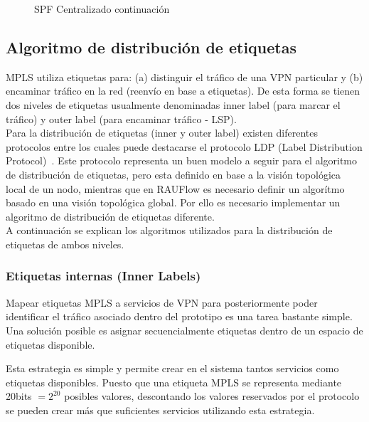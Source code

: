 \begin{figure}[ht!]
\begin{algorithm}[H]
{  
 \vspace{1cm} 
 }
 
\end{algorithm}
\caption[]{SPF Centralizado continuaci\'on}
\end{figure}

\newpage
\subsection{Algoritmo de distribución de etiquetas}
\label{section5.5.4}

MPLS utiliza etiquetas para: (a) distinguir el tr\'afico de una VPN particular y (b) encaminar tr\'afico en la red (reenvío en base a etiquetas). De esta forma se tienen dos niveles de etiquetas usualmente denominadas inner label (para marcar el tr\'afico) y outer label (para encaminar tr\'afico - LSP).\\

Para la distribución de etiquetas (inner y outer label) existen diferentes protocolos entre los cuales puede destacarse el protocolo LDP (Label Distribution Protocol)~\citep{LDPRFC}. Este protocolo representa un buen modelo a seguir para el algoritmo de distribución de etiquetas, pero esta definido en base a la visión topol\'ogica local de un nodo, mientras que en RAUFlow es necesario definir un algor\'itmo basado en una visi\'on topol\'ogica global. Por ello es necesario implementar un algoritmo de distribución de etiquetas diferente.\\

A continuaci\'on se explican los algoritmos utilizados para la distribución de etiquetas de ambos niveles.

\subsubsection{Etiquetas internas (Inner Labels)}
Mapear etiquetas MPLS a servicios de VPN para posteriormente poder identificar el tr\'afico asociado dentro del prototipo es una tarea bastante simple. Una soluci\'on posible es asignar secuencialmente etiquetas dentro de un espacio de etiquetas disponible.

Esta estrategia es simple y permite crear en el sistema tantos servicios como etiquetas disponibles. Puesto que una etiqueta MPLS se representa mediante 20bits $= 2^{20}$ posibles valores, descontando los  valores reservados por el protocolo se pueden crear m\'as que suficientes servicios utilizando esta estrategia.\\

